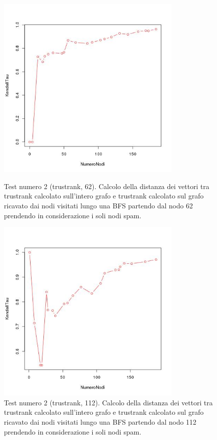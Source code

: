 \begin{figure}
\centering
 \includegraphics[height=9cm]{immagini/test2/trustrankBadNodesTestMode1_62}
 \caption{Test numero 2 (trustrank, 62). Calcolo della distanza dei vettori tra trustrank calcolato sull'intero grafo e trustrank calcolato sul grafo ricavato dai nodi visitati lungo una BFS partendo dal nodo 62 prendendo in considerazione i soli nodi spam. }
 \label{fig:test2trustModoB62}
\centering
 \includegraphics[height=9cm]{immagini/test2/trustrankBadNodesTestMode1_112}
 \caption{Test numero 2 (trustrank, 112). Calcolo della distanza dei vettori tra trustrank calcolato sull'intero grafo e trustrank calcolato sul grafo ricavato dai nodi visitati lungo una BFS partendo dal nodo 112 prendendo in considerazione i soli nodi spam.}
 \label{fig:test2trustModoB112}
\end{figure}


